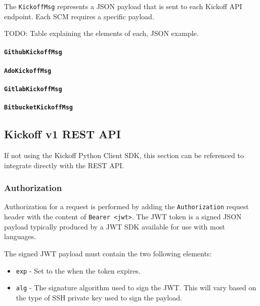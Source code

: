 The \texttt{KickoffMsg} represents a JSON payload that is sent to each Kickoff API endpoint.  Each SCM
requires a specific payload.

TODO: Table explaining the elements of each, JSON example.

\paragraph{\texttt{GithubKickoffMsg}}

\paragraph{\texttt{AdoKickoffMsg}}
\paragraph{\texttt{GitlabKickoffMsg}}
\paragraph{\texttt{BitbucketKickoffMsg}}


\subsection{Kickoff v1 REST API}

If not using the Kickoff Python Client SDK, this section can be referenced to integrate directly with
the REST API.


\subsubsection{Authorization}

Authorization for a request is performed by adding the \texttt{Authorization} request header
with the content of \texttt{Bearer <jwt>}.  The JWT token is a signed JSON payload typically produced
by a JWT SDK available for use with most languages.

The signed JWT payload must contain the two following elements:

\begin{itemize}
  \item \texttt{exp} - Set to the  when the token expires.
  \item \texttt{alg} - The signature algorithm used to sign the JWT.  This will vary based on the type of SSH private key
                       used to sign the payload.
\end{itemize}

